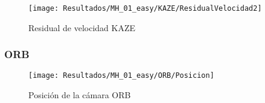 \begin{figure}[H]
	\centering
	\texttt{[image: Resultados/MH\_01\_easy/KAZE/ResidualVelocidad2]}
	\caption{Residual de velocidad KAZE}
	\label{imagen:Resultados/MH_01_easy/KAZE/ResidualVelocidad}
\end{figure}


%
%
%
%
%
%
%
%

\subsubsection{ORB}


\begin{figure}[H]
	\centering
	\texttt{[image: Resultados/MH\_01\_easy/ORB/Posicion]}
	\caption{Posición de la cámara ORB}
	\label{imagen:Resultados/MH_01_easy/ORB/Posicion}
\end{figure}




